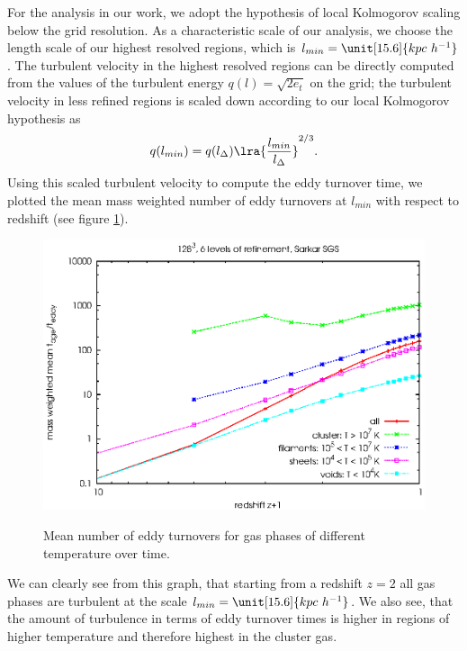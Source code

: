 For the analysis in our work, we adopt the hypothesis of local Kolmogorov
scaling below the grid resolution. As a characteristic scale of our analysis,
we choose the length scale of our highest resolved regions, which is 
$l_{min}=\unit[15.6]{kpc\ h^{-1}}$. The turbulent velocity in the highest
resolved regions can be directly computed from the values of the turbulent
energy $q(l) = \sqrt {2 e_t}$ on the grid; the turbulent velocity in less
refined regions is scaled down according to our local Kolmogorov hypothesis as
\begin{align}
q(l_{min}) = q(l_{\Delta}) \lra{\frac{l_{min}}{l_ {\Delta}}}^{2/3}
\label{eq:vturbscaled}.
\end{align}
Using this scaled turbulent velocity to compute the eddy turnover time, we 
plotted the mean mass weighted number of eddy turnovers at $l_{min}$ with
respect to redshift (see figure \ref{fig:eddy}). 
\begin{figure}[tp]
\centering
\includegraphics[width=0.7\linewidth]{chapter9/eddy_red_sar.eps}
\label{fig:eddy}
\caption{Mean number of eddy turnovers for gas phases of
different temperature over time.}
\end{figure}
We can clearly see from this graph, that starting from a redshift $z=2$ all gas
phases are turbulent at the scale $l_{min}=\unit[15.6]{kpc\ h^{-1}}$. We also
see, that the amount of turbulence in terms of eddy turnover times is higher in
regions of higher temperature and therefore highest in the cluster gas.    

